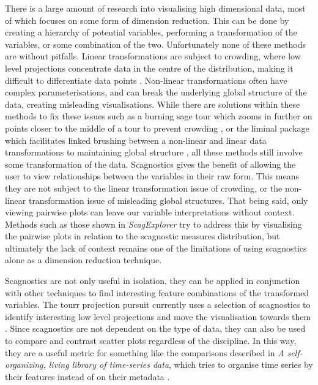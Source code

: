 There is a large amount of research into visualising high dimensional
data, most of which focuses on some form of dimension reduction. This
can be done by creating a hierarchy of potential variables, performing a
transformation of the variables, or some combination of the two.
Unfortunately none of these methods are without pitfalls. Linear
transformations are subject to crowding, where low level projections
concentrate data in the centre of the distribution, making it difficult
to differentiate data points \citep{crowding}. Non-linear
transformations often have complex parameterisations, and can break the
underlying global structure of the data, creating misleading
visualisations. While there are solutions within these methods to fix
these issues such as a burning sage tour which zooms in further on
points closer to the middle of a tour to prevent crowding
\citep{burningsage}, or the liminal package which facilitates linked
brushing between a non-linear and linear data transformations to
maintaining global structure \citep{liminal}, all these methods still
involve some transformation of the data. Scagnostics gives the benefit
of allowing the user to view relationships between the variables in
their raw form. This means they are not subject to the linear
transformation issue of crowding, or the non-linear transformation issue
of misleading global structures. That being said, only viewing pairwise
plots can leave our variable interpretations without context. Methods
such as those shown in \emph{ScagExplorer} \citep{scagexplorer} try to
address this by visualising the pairwise plots in relation to the
scagnostic measures distribution, but ultimately the lack of context
remains one of the limitations of using scagnostics alone as a dimension
reduction technique.

Scagnostics are not only useful in isolation, they can be applied in
conjunction with other techniques to find interesting feature
combinations of the transformed variables. The tourr projection pursuit
currently uses a selection of scagnostics to identify interesting low
level projections and move the visualisation towards them
\citep{tourrpp}. Since scagnostics are not dependent on the type of
data, they can also be used to compare and contrast scatter plots
regardless of the discipline. In this way, they are a useful metric for
something like the comparisons described in \emph{A self-organizing,
living library of time-series data}, which tries to organise time series
by their features instead of on their metadata \citep{sots}.

